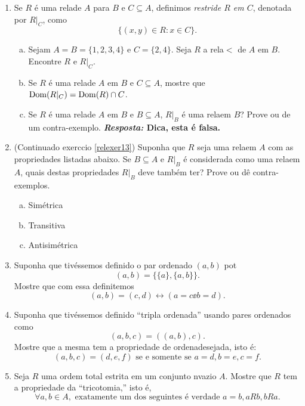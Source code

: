 \begin{enumerate}[{\bf 1.}]
\item\label{relexer13} Se $R$ \'e uma rela\cao de $A$ para $B$ e $C\subseteq A$, definimos {\it restri\cao de $R$ em $C$}, denotada por $R|_C$, como
\[
\{(x,y)\in R: x\in C\}.
\]
\begin{enumerate}[a)]
\item Sejam $A=B=\{1,2,3,4\}$ e $C=\{2,4\}$. Seja $R$ a rela\cao $<$ de $A$ em $B$. Encontre $R$ e $R|_C$. 
\item Se $R$ \'e uma rela\cao de $A$ em $B$ e $C\subseteq A$, mostre que $\operatorname{Dom}(R|_C)=\operatorname{Dom}(R)\cap C$. 
\item Se $R$ \'e uma rela\cao de $A$ em $B$ e $B\subseteq A$, $R|_B$ \'e uma rela\cao em $B$? Prove ou de um contra-exemplo. {\bf{\it Resposta:} Dica, esta \'e falsa.}
\end{enumerate}

\item (Continua\cao do exerc\ih cio \ref{relexer13}) Suponha que $R$ seja uma rela\cao em $A$ com as propriedades listadas abaixo. Se $B\subseteq A$ e $R|_B$ \'e considerada como uma rela\cao em $A$, quais destas propriedades $R|_B$ deve tamb\'em ter? Prove ou d\^e contra-exemplos.
\begin{enumerate}[a)]
\item Sim\'etrica 
\item Transitiva
\item Antisim\'etrica
\end{enumerate}

\item Suponha que tiv\'essemos definido o par ordenado $(a,b)$ pot
\[
(a,b)=\{\{a\},\{a,b\}\}.
\]
Mostre que com essa defini\cao temos
\[
(a,b)=(c,d)\leftrightarrow(a=c\ee b=d).
\]


\item Suponha que tiv\'essemos definido ``tripla ordenada'' usando pares ordenados como
\[
(a,b,c)=((a,b),c).
\]
Mostre que a mesma tem a propriedade de ordena\cao desejada, isto \'e:
\[
(a,b,c)=(d,e,f)\textrm{ se e somente se }a=d,b=e,c=f.
\]


\item Seja $R$ uma ordem total estrita em um conjunto n\ao vazio $A$. Mostre que $R$ tem a propriedade da ``tricotomia,'' isto \'e,
\[
\forall a,b\in A, \textrm{ exatamente um dos seguintes \'e verdade } a=b, aRb, bRa.
\]



\end{enumerate}
